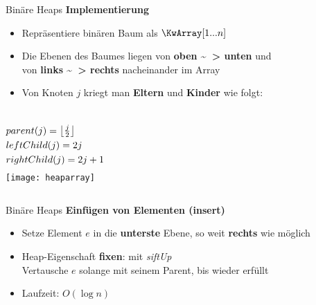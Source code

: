 \begin{frame}{Binäre Heaps}
	\textbf{Implementierung} \\
	\begin{itemize}
		\item Repräsentiere binären Baum als $\KwArray[1...n]$ 
		\item Die Ebenen des Baumes liegen von \textbf{oben \~~> unten} und \\ von \textbf{links \~~> rechts} nacheinander im Array 
		\pause
		\item Von Knoten $j$ kriegt man \textbf{Eltern} und \textbf{Kinder} wie folgt:
	\end{itemize}
	\begin{columns}
			\vspace{-7\baselineskip} %
			\begin{align*}
				&parent(j) = \left\lfloor\tfrac{j}{2}\right\rfloor \\
				&leftChild(j) = 2j \\
				&rightChild(j) = 2j + 1
			\end{align*}
			\texttt{[image: heaparray]}
	\end{columns}
\end{frame}

\begin{frame}{Binäre Heaps}
	\textbf{Einfügen von Elementen (insert)} 
	\begin{itemize}
		\item Setze Element $e$ in die \textbf{unterste} Ebene, so weit \textbf{rechts} wie möglich
		\pause
		\item Heap-Eigenschaft \textbf{fixen}: mit \emph{siftUp} \\
		Vertausche $e$ solange mit seinem Parent, bis wieder erfüllt
		\pause
		\item Laufzeit: $O(\log n)$
	\end{itemize}
\end{frame}

